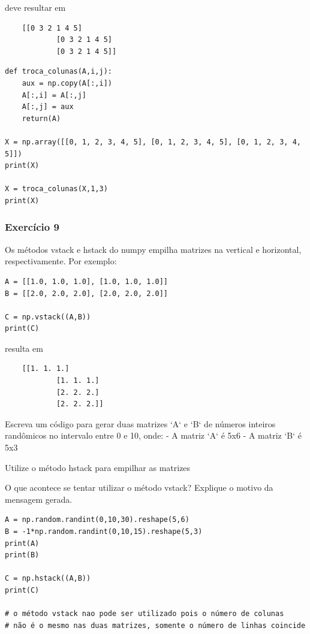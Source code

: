 \documentclass[../numerical_methods.tex]{subfiles}
\begin{document}
deve resultar em
\begin{verbatim}
	[[0 3 2 1 4 5]
			[0 3 2 1 4 5]
			[0 3 2 1 4 5]]
\end{verbatim}


\begin{verbatim}
def troca_colunas(A,i,j):
    aux = np.copy(A[:,i])
    A[:,i] = A[:,j]
    A[:,j] = aux
    return(A)

X = np.array([[0, 1, 2, 3, 4, 5], [0, 1, 2, 3, 4, 5], [0, 1, 2, 3, 4, 5]])
print(X)

X = troca_colunas(X,1,3)
print(X)
\end{verbatim}


\subsubsection{Exercício 9}
Os métodos vstack e hstack do numpy empilha matrizes na vertical e horizontal, respectivamente. Por exemplo:
\begin{verbatim}
A = [[1.0, 1.0, 1.0], [1.0, 1.0, 1.0]]
B = [[2.0, 2.0, 2.0], [2.0, 2.0, 2.0]]

C = np.vstack((A,B))
print(C)
\end{verbatim}

resulta em
\begin{verbatim}
	[[1. 1. 1.]
			[1. 1. 1.]
			[2. 2. 2.]
			[2. 2. 2.]]
\end{verbatim}

Escreva um código para gerar duas matrizes `A` e `B` de números inteiros randômicos no intervalo entre 0 e 10, onde:
- A matriz `A` é 5x6
- A matriz `B` é 5x3

Utilize o método hstack para empilhar as matrizes

O que acontece se tentar utilizar o método vstack? Explique o motivo da mensagem gerada.

\begin{verbatim}
A = np.random.randint(0,10,30).reshape(5,6)
B = -1*np.random.randint(0,10,15).reshape(5,3)
print(A)
print(B)

C = np.hstack((A,B))
print(C)

# o método vstack nao pode ser utilizado pois o número de colunas
# não é o mesmo nas duas matrizes, somente o número de linhas coincide
\end{verbatim}
\end{document}
